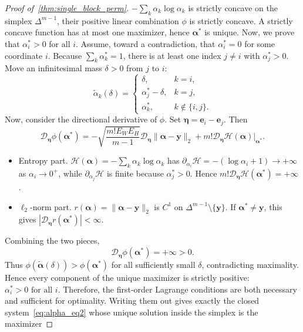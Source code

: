 \documentclass[11pt]{article}
\begin{document}
\begin{proof}[Proof of~\cref{thm:single_block_perm}]
$-\sum_k\alpha_k\log\alpha_k$ is strictly concave on the simplex
$\Delta^{m-1}$, their positive linear combination $\phi$ is strictly concave. A strictly concave function
has at most one maximizer, hence $\boldsymbol{\alpha}^*$ is unique. Now, we prove that $\alpha_i^* >0$ for all $i$. Assume, toward a contradiction, that $\alpha_i^*=0$ for some coordinate
$i$.  Because $\sum_k\alpha_k^*=1$, there is at least one index
$j\neq i$ with $\alpha_j^*>0$. Move an infinitesimal mass $\delta>0$ from $j$ to $i$:
\[
  \tilde{\alpha}_k(\delta)=
  \begin{cases}
       \delta,            & k=i,\\[4pt]
       \alpha_j^*-\delta,& k=j,\\[4pt]
       \alpha_k^*,   & k\notin\{i,j\}.
  \end{cases}
\]
Now, consider the directional derivative of $\phi$.  
Set $\boldsymbol{\eta}=\boldsymbol{e}_i-\boldsymbol{e}_j$.  Then
\[
  \mathcal{D}_{\boldsymbol{\eta}} \phi(\boldsymbol{\alpha}^*)
  =-\sqrt{\frac{m! E_W E_H}{ m-1 }} \mathcal{D}_{\boldsymbol{\eta}}\|\boldsymbol{\alpha}-\boldsymbol{y}\|_2
     + m! \mathcal{D}_{\boldsymbol{\eta}}\mathcal{H}(\boldsymbol{\alpha})\Big|_{\boldsymbol{\alpha}^*}.
\]
\begin{itemize}
\item Entropy part.
      $\mathcal{H}(\boldsymbol{\alpha})=-\sum_k\alpha_k\log\alpha_k$ has
      $\partial_{\alpha_i}\mathcal{H}=-(\log\alpha_i+1)\to+\infty$ as
      $\alpha_i\to0^{+}$, while $\partial_{\alpha_j}\mathcal{H}$ is finite because
      $\alpha_j^*>0$.  Hence
      $m! \mathcal{D}_{\boldsymbol{\eta}}\mathcal{H}(\boldsymbol{\alpha}^*)=+\infty$.
\item $\ell_2$-norm part.
      $r(\boldsymbol{\alpha})=\|\boldsymbol{\alpha}-\boldsymbol{y}\|_2$ is
      $C^{1}$ on $\Delta^{m-1}\setminus\{\boldsymbol{y}\}$. If \(\boldsymbol{\alpha}^*\neq\boldsymbol{y}\), this gives \( |\mathcal{D}_{\boldsymbol{\eta}}r(\boldsymbol{\alpha}^*)|<\infty \). 
\end{itemize}
Combining the two pieces,
\[
  \mathcal{D}_{\boldsymbol{\eta}}\phi(\boldsymbol{\alpha}^*)=+\infty>0.
\]
Thus $\phi(\tilde{\boldsymbol{\alpha}}(\delta))>\phi(\boldsymbol{\alpha}^*)$
for all sufficiently small $\delta$, contradicting maximality.  Hence every
component of the unique maximizer is strictly positive:
$\alpha_i^*>0\text{ for all }i$. Therefore, the first-order Lagrange conditions are both necessary and sufficient for
optimality. Writing them out gives exactly the closed system~\cref{eq:alpha_eq2} whose unique solution inside the simplex is the maximizer

\end{proof}
\end{document}
